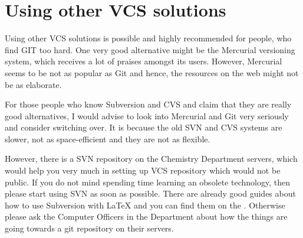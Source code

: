 \documentclass[
    draft
]{scrartcl}
\begin{document}


\section{Using other VCS solutions}

Using other VCS solutions is possible and highly recommended for people, who
find GIT too hard. 
%
One very good alternative might be the Mercurial versioning system, which
receives a lot of praises amongst its users.
%
However, Mercurial seems to be not as popular as Git and hence, the resources on
the web might not be as elaborate.

For those people who know Subversion and CVS and claim that they are really good
alternatives, I would advise to look into Mercurial and Git very seriously and
consider switching over.
%
It is because the old SVN and CVS systems are slower, not as space-efficient and
they are not as flexible.

However, there is a SVN repository on the Chemistry Department servers, which
would help you very much in setting up VCS repository which would not be public.
%
If you do not mind spending time learning an obsolete technology, then please
start using SVN as soon as possible.
%
There are already good guides about how to use Subversion with \LaTeX{} and you
can find them on the
.
%
Otherwise please ask the Computer Officers in the Department about how the
things are going towards a git repository on their servers.
\end{document}

